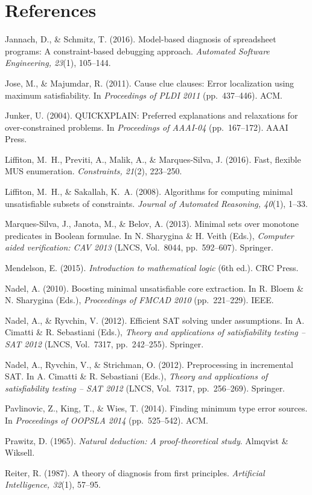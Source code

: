 \documentclass[11pt,reqno]{amsart}
\theoremstyle{plain}
\theoremstyle{definition}
\newenvironment{references}
  {\section*{References}\small\setlength{\parindent}{0pt}%
   \everypar{\hangindent=1.6em\hangafter=1}\setlength{\parskip}{3pt}}
  {\par}
\begin{document}
\begin{references}
Jannach, D., \& Schmitz, T. (2016). Model-based diagnosis of spreadsheet programs:
A constraint-based debugging approach. \emph{Automated Software Engineering,
23}(1), 105--144.

Jose, M., \& Majumdar, R. (2011). Cause clue clauses: Error localization using
maximum satisfiability. In \emph{Proceedings of PLDI 2011} (pp.~437--446). ACM.

Junker, U. (2004). QUICKXPLAIN: Preferred explanations and relaxations for
over-constrained problems. In \emph{Proceedings of AAAI-04} (pp.~167--172). AAAI
Press.

Liffiton, M.~H., Previti, A., Malik, A., \& Marques-Silva, J. (2016). Fast,
flexible MUS enumeration. \emph{Constraints, 21}(2), 223--250.

Liffiton, M.~H., \& Sakallah, K.~A. (2008). Algorithms for computing minimal
unsatisfiable subsets of constraints. \emph{Journal of Automated Reasoning, 40}(1),
1--33.

Marques-Silva, J., Janota, M., \& Belov, A. (2013). Minimal sets over monotone
predicates in Boolean formulae. In N. Sharygina \& H. Veith (Eds.), \emph{Computer
aided verification: CAV 2013} (LNCS, Vol.~8044, pp.~592--607). Springer.

Mendelson, E. (2015). \emph{Introduction to mathematical logic} (6th ed.). CRC
Press.

Nadel, A. (2010). Boosting minimal unsatisfiable core extraction. In R. Bloem \& N.
Sharygina (Eds.), \emph{Proceedings of FMCAD 2010} (pp.~221--229). IEEE.

Nadel, A., \& Ryvchin, V. (2012). Efficient SAT solving under assumptions. In A.
Cimatti \& R. Sebastiani (Eds.), \emph{Theory and applications of satisfiability
testing -- SAT 2012} (LNCS, Vol.~7317, pp.~242--255). Springer.

Nadel, A., Ryvchin, V., \& Strichman, O. (2012). Preprocessing in incremental SAT.
In A. Cimatti \& R. Sebastiani (Eds.), \emph{Theory and applications of
satisfiability testing -- SAT 2012} (LNCS, Vol.~7317, pp.~256--269). Springer.

Pavlinovic, Z., King, T., \& Wies, T. (2014). Finding minimum type error sources.
In \emph{Proceedings of OOPSLA 2014} (pp.~525--542). ACM.

Prawitz, D. (1965). \emph{Natural deduction: A proof-theoretical study}. Almqvist
\& Wiksell.

Reiter, R. (1987). A theory of diagnosis from first principles. \emph{Artificial
Intelligence, 32}(1), 57--95.


\end{references}
\end{document}
